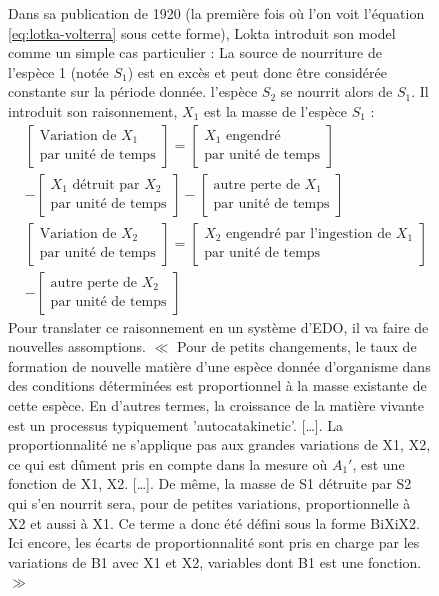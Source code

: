\documentclass{wsdcr}
\begin{document}
\begin{figure}[b!]
{\begin{minipage}{.95\linewidth}
Dans sa publication de 1920 (la première fois où l'on voit l'équation \ref{eq:lotka-volterra} sous cette forme), Lokta introduit son model comme un simple cas particulier : La source de nourriture de l'espèce 1 (notée $S_1$) est en excès et peut donc être considérée constante sur la période donnée. l'espèce $S_2$ se nourrit alors de $S_1$.
Il introduit son raisonnement, $X_1$ est la masse de l'espèce $S_1$  :
\begin{equation}
\begin{aligned}
&\begin{bmatrix}
\text{Variation de }X_1 \\ \text{par unité de temps}
\end{bmatrix}
=
\begin{bmatrix}
X_1\text{ engendré}\\ \text{par unité de temps}
\end{bmatrix} \\
&- 
\begin{bmatrix}
X_1\text{ détruit par }X_2\\ \text{par unité de temps}
\end{bmatrix}
-
\begin{bmatrix}
\text{autre perte de }X_1\\ \text{par unité de temps}
\end{bmatrix} \\
&\begin{bmatrix}
\text{Variation de }X_2 \\ \text{par unité de temps}
\end{bmatrix}
=
\begin{bmatrix}
X_2\text{ engendré par l'ingestion de }X_1\\ \text{par unité de temps}
\end{bmatrix} \\
&-
\begin{bmatrix}
\text{autre perte de }X_2\\ \text{par unité de temps}
\end{bmatrix} 
\end{aligned}
\end{equation}
Pour translater ce raisonnement en un système d'EDO, il va faire de nouvelles assomptions.
$\ll$ Pour de petits changements, le taux de formation de nouvelle matière d'une espèce donnée d'organisme dans des conditions déterminées est proportionnel à la masse existante de cette espèce. En d'autres termes, la croissance de la matière vivante est un processus typiquement 'autocatakinetic'. […]. La proportionnalité ne s'applique pas aux grandes variations de X1, X2, ce qui est dûment pris en compte dans la mesure où $A_1'$, est une fonction de X1, X2. […]. De même, la masse de S1 détruite par S2 qui s'en nourrit sera, pour de petites variations, proportionnelle à X2 et aussi à X1. Ce terme a donc été défini sous la forme BiXiX2. Ici encore, les écarts de proportionnalité sont pris en charge par les variations de B1 avec X1 et X2, variables dont B1 est une fonction. $\gg$

\end{minipage}}
\end{figure}
\end{document}
